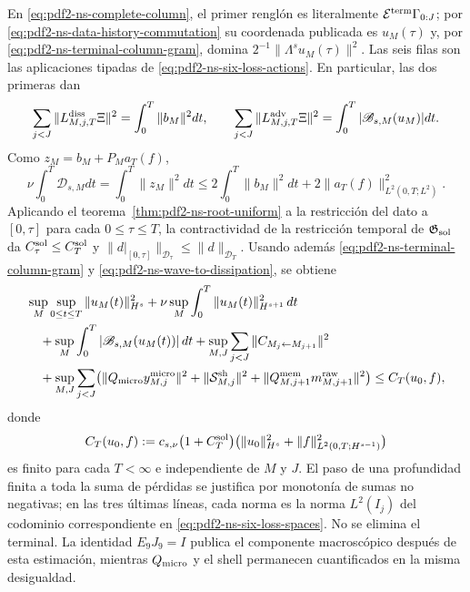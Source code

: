 En \eqref{eq:pdf2-ns-complete-column}, el primer renglón es literalmente
$\mathcal E^{\rm term}\Gamma_{0:J}$; por
\eqref{eq:pdf2-ns-data-history-commutation} su coordenada publicada es
$u_M(\tau)$ y, por \eqref{eq:pdf2-ns-terminal-column-gram}, domina
$2^{-1}\|\Lambda^su_M(\tau)\|^2$. Las seis filas son las aplicaciones tipadas de
\eqref{eq:pdf2-ns-six-loss-actions}. En particular, las dos primeras dan
\[
 \sum_{j<J}\|L^{\rm diss}_{M,j,T}\Xi\|^2
 =\int_0^T\|b_M\|^2dt,
 \qquad
 \sum_{j<J}\|L^{\rm adv}_{M,j,T}\Xi\|^2
 =\int_0^T|\mathscr B_{s,M}(u_M)|dt.
\]
Como $z_M=b_M+P_Ma_T(f)$,
\begin{equation}\label{eq:pdf2-ns-wave-to-dissipation}
 \nu\int_0^T \mathscr D_{s,M}dt
 =\int_0^T\|z_M\|^2dt
 \leq2\int_0^T\|b_M\|^2dt+2\|a_T(f)\|_{L^2(0,T;L^2)}^2.
\end{equation}
Aplicando el teorema~\ref{thm:pdf2-ns-root-uniform} a la restricción del dato a
$[0,\tau]$ para cada $0\le\tau\le T$, la contractividad de la restricción
temporal de $\mathfrak G_{\rm sol}$ da
$C_\tau^{\rm sol}\le C_T^{\rm sol}$ y
$\|d|_{[0,\tau]}\|_{\mathcal D_\tau}\le\|d\|_{\mathcal D_T}$. Usando además
\eqref{eq:pdf2-ns-terminal-column-gram} y
\eqref{eq:pdf2-ns-wave-to-dissipation}, se obtiene
\begin{equation}\label{eq:pdf2-ns-cota-requerida}
 \begin{aligned}
 &\sup_M\sup_{0\le t\le T}\|u_M(t)\|_{H^s}^2
 +\nu\sup_M\int_0^T\|u_M(t)\|_{H^{s+1}}^2\,dt\\
 &\quad
 +\sup_M\int_0^T|\mathscr B_{s,M}(u_M(t))|\,dt
 +\sup_{M,J}\sum_{j<J}\|C_{M_j\leftarrow M_{j+1}}\|^2\\
 &\quad
 +\sup_{M,J}\sum_{j<J}
   \bigl(\|Q_{\rm micro}y^{\rm micro}_{M,j}\|^2
          +\|\mathcal S_{M,j}^{\rm sh}\|^2
          +\|Q^{\rm mem}_{M,j+1}m^{\rm raw}_{M,j+1}\|^2\bigr)
 \le C_T(u_0,f),
 \end{aligned}
\end{equation}
donde
\[
 C_T(u_0,f):=c_{s,\nu}\bigl(1+C_T^{\rm sol}\bigr)
 \bigl(\|u_0\|_{H^s}^2+
       \|f\|_{L^2(0,T;H^{s-1})}^2\bigr)
\]
es finito para cada $T<\infty$ e independiente de $M$ y $J$. El paso de una
profundidad finita a toda la suma de pérdidas se justifica por monotonía de sumas no
negativas; en las tres últimas líneas, cada norma es la norma $L^2(I_j)$ del
codominio correspondiente en \eqref{eq:pdf2-ns-six-loss-spaces}. No se elimina
el terminal. La identidad
$E_9J_9=I$ publica el componente macroscópico después de esta estimación, mientras
$Q_{\rm micro}$ y el shell permanecen cuantificados en la misma desigualdad.

